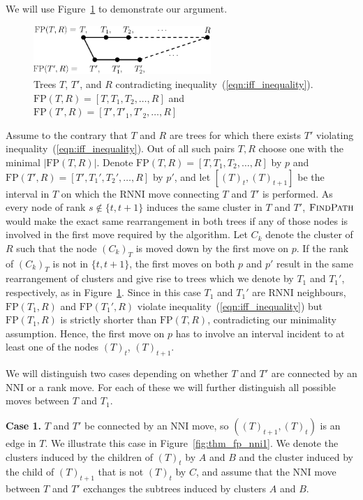 \documentclass{amsart}
\newcommand{\rnni}{\mathrm{RNNI}}
\newcommand{\findpath}{\textsc{FindPath}}
\newcommand{\nni}{\mathrm{NNI}}
\newcommand{\fp}{\mathrm{FP}}
\begin{document}
We will use Figure~\ref{fig:proof_idea} to demonstrate our argument.

\begin{figure}[!hbt]
\centering
\includegraphics[width=0.6\textwidth]{proof_idea}
\vspace{12pt}
\caption{Trees $T$, $T'$, and $R$ contradicting inequality~(\ref{eqn:iff_inequality}).
$\fp(T,R) = [T,T_1,T_2, \ldots, R]$ and $\fp(T',R) = [T',T'_1,T'_2, \ldots, R]$}
\label{fig:proof_idea}
\end{figure}

Assume to the contrary that $T$ and $R$ are trees for which there exists $T'$ violating inequality~(\ref{eqn:iff_inequality}).
Out of all such pairs $T, R$ choose one with the minimal $|\fp(T, R)|$.
Denote $\fp(T,R) = [T, T_1, T_2, \ldots, R]$ by $p$ and $\fp(T', R) = [T', T_1', T_2', \ldots, R]$ by $p'$, and let $[(T)_t, (T)_{t+1}]$ be the interval in $T$ on which the $\rnni$ move connecting $T$ and $T'$ is performed.
As every node of rank $s \notin \{t, t+1\}$ induces the same cluster in $T$ and $T'$, $\findpath$ would make the exact same rearrangement in both trees if any of those nodes is involved in the first move required by the algorithm.
Let $C_k$ denote the cluster of $R$ such that the node $(C_k)_T$ is moved down by the first move on $p$.
If the rank of $(C_k)_T$ is not in $\{t, t+1\}$, the first moves on both $p$ and $p'$ result in the same rearrangement of clusters and give rise to trees which we denote by $T_1$ and $T_1'$, respectively, as in Figure~\ref{fig:proof_idea}.
Since in this case $T_1$ and $T_1'$ are $\rnni$ neighbours, $\fp(T_1, R)$  and $\fp(T_1', R)$ violate inequality~(\ref{eqn:iff_inequality}) but $\fp(T_1, R)$ is strictly shorter than $\fp(T, R)$, contradicting our minimality assumption.
Hence, the first move on $p$ has to involve an interval incident to at least one of the nodes $(T)_t$, $(T)_{t+1}$.

We will distinguish two cases depending on whether $T$ and $T'$ are connected by an $\nni$ or a rank move.
For each of these we will further distinguish all possible moves between $T$ and $T_1$.

\textbf{Case 1.} $T$ and $T'$ be connected by an $\nni$ move, so $((T)_{t+1},(T)_t)$ is an edge in $T$.
We illustrate this case in Figure~\ref{fig:thm_fp_nni1}.
We denote the clusters induced by the children of $(T)_t$ by $A$ and $B$ and the cluster induced by the child of $(T)_{t+1}$ that is not $(T)_t$ by $C$, and assume that the $\nni$ move between $T$ and $T'$ exchanges the subtrees induced by clusters $A$ and $B$.
\end{document}
